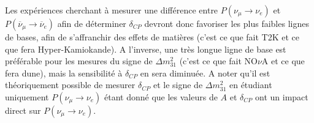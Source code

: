             Les expériences cherchant à mesurer une différence entre $P(\nu_{\mu}\to\nu_e)$ et $P(\overline{\nu}_{\mu}\to\overline{\nu}_e)$ afin de déterminer $\delta_{CP}$ devront donc favoriser les plus faibles lignes de bases, afin de s'affranchir des effets de matières (c'est ce que fait T2K et ce que fera Hyper-Kamiokande). A l'inverse, une très longue ligne de base est préférable pour les mesures du signe de $\Delta m^2_{31}$ (c'est ce que fait NO$\nu$A et ce que fera \gls{dune}), mais la sensibilité à $\delta_{CP}$ en sera diminuée. A noter qu'il est théoriquement possible de mesurer $\delta_{CP}$ et le signe de $\Delta m^2_{31}$ en étudiant uniquement $P(\nu_{\mu}\to\nu_e)$ étant donné que les valeurs de $A$ et $\delta_{CP}$ ont un impact direct sur $P(\nu_{\mu}\to\nu_e)$.

            
